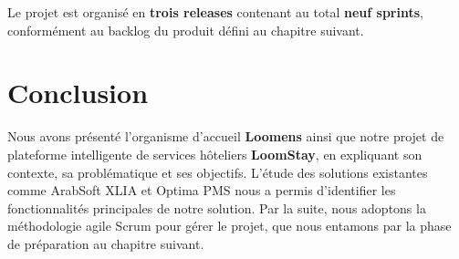 Le projet est organisé en \textbf{trois releases} contenant au total \textbf{neuf sprints}, conformément au backlog du produit défini au chapitre suivant.

\section*{Conclusion}
Nous avons présenté l'organisme d'accueil \textbf{Loomens} ainsi que notre projet de plateforme intelligente de services hôteliers \textbf{LoomStay}, en expliquant son contexte, sa problématique et ses objectifs. L'étude des solutions existantes comme ArabSoft XLIA et Optima PMS nous a permis d'identifier les fonctionnalités principales de notre solution. Par la suite, nous adoptons la méthodologie agile Scrum pour gérer le projet, que nous entamons par la phase de préparation au chapitre suivant.
